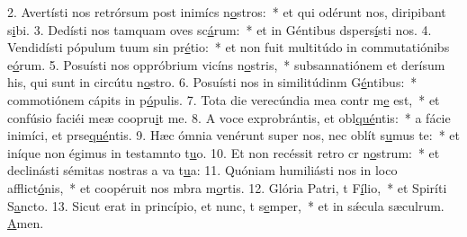 2. Avertísti nos retrórsum post inimícs n\uline{o}stros:~* et qui odérunt nos, diripibant s\uline{i}bi.
3. Dedísti nos tamquam oves sc\uline{á}rum:~* et in Géntibus dspers\uline{í}sti nos.
4. Vendidísti pópulum tuum sin pr\uline{é}tio:~* et non fuit multitúdo in commutatiónibs e\uline{ó}rum.
5. Posuísti nos oppróbrium vicíns n\uline{o}stris,~* subsannatiónem et derísum his, qui sunt in circútu n\uline{o}stro.
6. Posuísti nos in similitúdinm G\uline{é}ntibus:~* commotiónem cápits in p\uline{ó}pulis.
7. Tota die verecúndia mea contr m\uline{e} est,~* et confúsio faciéi meæ coopru\uline{i}t me.
8. A voce exprobrántis, et obl\uline{qué}ntis:~* a fácie inimíci, et prse\uline{qué}ntis.
9. Hæc ómnia venérunt super nos, nec oblít s\uline{u}mus te:~* et iníque non égimus in testamnto t\uline{u}o.
10. Et non recéssit retro cr n\uline{o}strum:~* et declinásti sémitas nostras a va t\uline{u}a:
11. Quóniam humiliásti nos in loco afflict\uline{ó}nis,~* et coopéruit nos mbra m\uline{o}rtis.
12. Glória Patri, t F\uline{í}lio,~* et Spiríti S\uline{a}ncto.
13. Sicut erat in princípio, et nunc, t s\uline{e}mper,~* et in sǽcula sæculrum. \uline{A}men.
